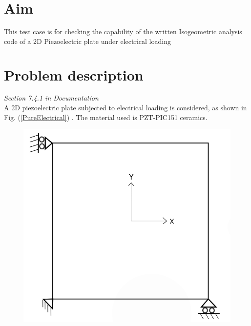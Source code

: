 \documentclass[12pt]{article}
\begin{document}
\section{Aim}
This test case is for checking the capability of the written Isogeometric analysis code of a 2D Piezoelectric plate under electrical loading
\section{Problem description} \label{2DPPWEL}
\emph{Section 7.4.1 in Documentation}\\
A 2D piezoelectric plate subjected to electrical loading is considered, as shown in Fig. (\ref{PureElectrical}) . The material used is PZT-PIC151 ceramics.

\begin{figure}[H]
	\centering
	\begin{minipage}{.5\textwidth}
		\centering
		\includegraphics[width=0.8\linewidth]{2DPlate.png}
		\label{2Dplate}
	\end{minipage}%
	\begin{minipage}{.4\textwidth}
		\centering

\end{minipage}
\end{figure}
\end{document}
